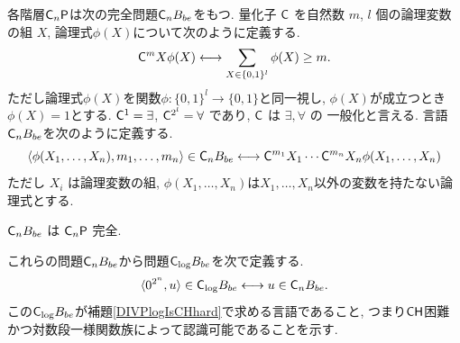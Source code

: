 各階層$\mathsf{C}_n \mathsf{P}$は次の完全問題$\mathsf{C}_n B_{be}$をもつ.
量化子 $\mathsf{C}$ を自然数 $m$, $l$ 個の論理変数の組 $X$,
論理式$\phi(X)$について次のように定義する.
\begin{equation}
 \mathsf{C}^m X \phi(X) 
  \longleftrightarrow 
  \sum_{X \in \{0,1\}^l} \phi(X) \ge m.
\end{equation}
ただし論理式$\phi(X)$を関数$\phi \colon \{0,1\}^l \to \{0,1\}$と同一視し,
$\phi(X)$が成立つとき$\phi(X)=1$とする.
$\mathsf{C}^1 = \exists$, $\mathsf{C}^{2^l} = \forall$ であり, $\mathsf{C}$ は $\exists, \forall$ の
一般化と言える.
言語$\mathsf{C}_n B_{be}$を次のように定義する.
\begin{equation}
 \langle \phi(X_1, \dots, X_n), m_1, \dots, m_n \rangle \in \mathsf{C}_n B_{be}
 \longleftrightarrow
 \mathsf{C}^{m_1}{X_1} \cdots \mathsf{C}^{m_n}{X_n} \phi(X_1, \dots, X_n) 
\end{equation}
ただし
$X_i$ は論理変数の組,
$\phi(X_1, \dots, X_n)$は$X_1, \dots, X_n$以外の変数を持たない論理式とする.

\begin{lemma} \label{lemma:CnP-complete}
 $\mathsf{C}_n B_{be}$ は $\mathsf{C}_n\mathsf{P}$ 完全.
\end{lemma}

これらの問題$\mathsf{C}_n B_{be}$から問題$\mathsf{C}_{\log} B_{be}$を次で定義する.
\begin{equation}
 \langle 0^{2^n}, u \rangle \in \mathsf{C}_{\log} B_{be}
 \longleftrightarrow
 u \in \mathsf{C}_n B_{be}.
\end{equation}
この$\mathsf{C}_{\log} B_{be}$が補題\ref{DIVPlogIsCHhard}で求める言語であること,
つまり$\mathsf{CH}$困難かつ対数段一様関数族によって認識可能であることを示す.

